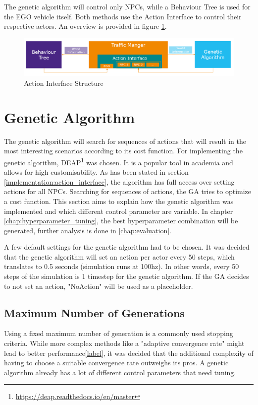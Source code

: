 The genetic algorithm will control only NPCs, while a Behaviour Tree is used for the EGO vehicle itself. Both methods use the Action Interface to control their respective actors. An overview is provided in figure \ref{figure:traffic_manager:structure}.

\begin{figure}[ht] 
	\includegraphics[width=1\linewidth]{figures/tm_structure}
	\caption{Action Interface Structure}
	\label{figure:traffic_manager:structure}
\end{figure}

\section{Genetic Algorithm}
The genetic algorithm will search for sequences of actions that will result in the most interesting scenarios according to its cost function.
For implementing the genetic algorithm, DEAP\footnote{\url{https://deap.readthedocs.io/en/master}} was chosen. It is a popular tool in academia and allows for high customisability.
As has been stated in section \ref{implementation:action_interface}, the algorithm has full access over setting actions for all NPCs. Searching for sequences of actions, the GA tries to optimize a cost function. This section aims to explain how the genetic algorithm was implemented and which different control parameter are variable. In chapter \ref{chap:hyperparameter_tuning}, the best hyperparameter combination will be generated, further analysis is done in \ref{chap:evaluation}.

A few default settings for the genetic algorithm had to be chosen. It was decided that the genetic algorithm will set an action per actor every 50 steps, which translates to 0.5 seconds (simulation runs at 100hz). In other words, every 50 steps of the simulation is 1 timestep for the genetic algorithm. If the GA decides to not set an action, "NoAction" will be used as a placeholder.

\subsection{Maximum Number of Generations}
Using a fixed maximum number of generation is a commonly used stopping criteria. While more complex methods like a "adaptive convergence rate" might lead to better performance\ref{label}, it was decided that the additional complexity of having to choose a suitable convergence rate outweighs its pros. A genetic algorithm already has a lot of different control parameters that need tuning.

